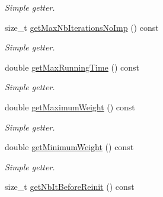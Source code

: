\begin{DoxyCompactItemize}
\begin{DoxyCompactList}\small\item\em Simple getter. \end{DoxyCompactList}\item 
\hypertarget{classALNS__Parameters_aa5a042b55fe115f41bebdf99df460ee5}{size\-\_\-t \hyperlink{classALNS__Parameters_aa5a042b55fe115f41bebdf99df460ee5}{get\-Max\-Nb\-Iterations\-No\-Imp} () const }\label{classALNS__Parameters_aa5a042b55fe115f41bebdf99df460ee5}

\begin{DoxyCompactList}\small\item\em Simple getter. \end{DoxyCompactList}\item 
\hypertarget{classALNS__Parameters_a1a81595127071d072e30e0ea02ed3abc}{double \hyperlink{classALNS__Parameters_a1a81595127071d072e30e0ea02ed3abc}{get\-Max\-Running\-Time} () const }\label{classALNS__Parameters_a1a81595127071d072e30e0ea02ed3abc}

\begin{DoxyCompactList}\small\item\em Simple getter. \end{DoxyCompactList}\item 
\hypertarget{classALNS__Parameters_a4a4f411b74c916a981086827eb069ec1}{double \hyperlink{classALNS__Parameters_a4a4f411b74c916a981086827eb069ec1}{get\-Maximum\-Weight} () const }\label{classALNS__Parameters_a4a4f411b74c916a981086827eb069ec1}

\begin{DoxyCompactList}\small\item\em Simple getter. \end{DoxyCompactList}\item 
\hypertarget{classALNS__Parameters_a8519a3e48552b3712e1f070e3a431daf}{double \hyperlink{classALNS__Parameters_a8519a3e48552b3712e1f070e3a431daf}{get\-Minimum\-Weight} () const }\label{classALNS__Parameters_a8519a3e48552b3712e1f070e3a431daf}

\begin{DoxyCompactList}\small\item\em Simple getter. \end{DoxyCompactList}\item 
\hypertarget{classALNS__Parameters_aef0a553ad9753726a122a8e50b36e44e}{size\-\_\-t \hyperlink{classALNS__Parameters_aef0a553ad9753726a122a8e50b36e44e}{get\-Nb\-It\-Before\-Reinit} () const }\label{classALNS__Parameters_aef0a553ad9753726a122a8e50b36e44e}


\end{DoxyCompactItemize}

